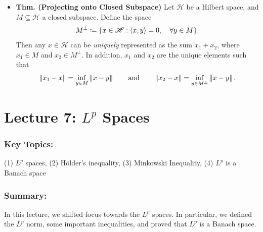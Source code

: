 \documentclass{article}
\begin{document}
\begin{itemize}
\begin{solutions}
\begin{quote}
\begin{equation}
			\end{equation}
			(\textbf{Uniqueness}) Suppose there exist $y_{1}, y_{2} \in M$ so that 
			\begin{equation}
				\norm{x - y_{i}} = \inf_{y \in M}\norm{x - y}. 
			\end{equation}
		\end{quote}
	\end{solutions}
	\item \textbf{Thm. (Projecting onto Closed Subspace)} Let $\mathscr{H}$ be a Hilbert space, and $M \subseteq \mathscr{H}$ a closed subspace. Define the space 
	\begin{equation*}
		M^{\perp} \coloneqq \brac*{x \in \mathscr{H}: \braket{x,y} =0, \quad \forall y \in M}. 
	\end{equation*}	
	Then any $x \in \mathscr{H}$ can be \textit{uniquely} represented as the sum $x_{1} + x_{2}$, where $x_{1} \in M$ and $x_{2} \in M^{\perp}$. In addition, $x_{1}$ and $x_{2}$ are the unique elements such that 
	\begin{equation}
		\left\Vert x_{1} - x \right\Vert = \inf_{y \in M}\left\Vert x - y \right\Vert\qquad \text{and} \qquad \left\Vert x_{2} - x \right\Vert = \inf_{y \in M^{\perp}}\left\Vert x - y \right\Vert. 
	\end{equation}
\end{itemize}
\newpage 
\section{Lecture 7: \texorpdfstring{$L^{p}$}{Lp} Spaces}
\subsubsection{Key Topics:}
(1) $L^{p}$ spaces, (2) H\"older's inequality, (3) Minkowski Inequality, (4) $L^{p}$ is a Banach space
\subsubsection{Summary:}
In this lecture, we shifted focus towards the $L^{p}$ spaces. In particular, we defined the $L^{p}$ norm, some important inequalities, and proved that $L^{p}$ is a Banach space. 
\end{document}
